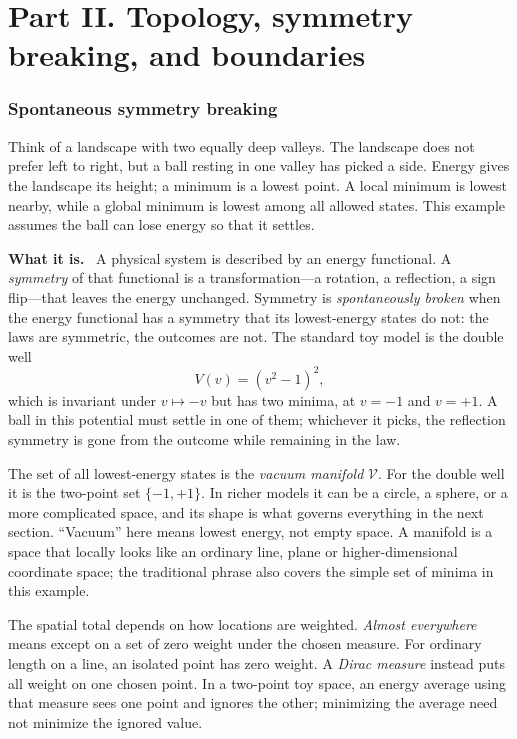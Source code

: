 \documentclass[11pt]{article}
\newcommand{\what}{\par\smallskip\noindent\textbf{What it is.}\ }
\begin{document}
\part*{Part II. Topology, symmetry breaking, and boundaries}
\section{Spontaneous symmetry breaking}
\label{sec:ssb}

Think of a landscape with two equally deep valleys. The landscape does not
prefer left to right, but a ball resting in one valley has picked a side.
Energy gives the landscape its height; a minimum is a lowest point. A local
minimum is lowest nearby, while a global minimum is lowest among all allowed
states. This example assumes the ball can lose energy so that it settles.

\what
A physical system is described by an energy functional. A \emph{symmetry} of
that functional is a transformation---a rotation, a reflection, a sign
flip---that leaves the energy unchanged. Symmetry is \emph{spontaneously
broken} when the energy functional has a symmetry that its lowest-energy
states do not: the laws are symmetric, the outcomes are not. The standard toy
model is the double well
\[
 V(v) = (v^2-1)^2 ,
\]
which is invariant under $v\mapsto -v$ but has two minima, at $v=-1$ and
$v=+1$. A ball in this potential must settle in one of them; whichever it
picks, the reflection symmetry is gone from the outcome while remaining in the
law.

The set of all lowest-energy states is the \emph{vacuum manifold}
$\mathcal{V}$. For the double well it is the two-point set $\{-1,+1\}$. In
richer models it can be a circle, a sphere, or a more complicated space, and
its shape is what governs everything in the next section. ``Vacuum'' here
means lowest energy, not empty space. A manifold is a space that locally looks
like an ordinary line, plane or higher-dimensional coordinate space; the
traditional phrase also covers the simple set of minima in this example.

The spatial total depends on how locations are weighted. \emph{Almost
everywhere} means except on a set of zero weight under the chosen measure.
For ordinary length on a line, an isolated point has zero weight. A
\emph{Dirac measure} instead puts all weight on one chosen point. In a
two-point toy space, an energy average using that measure sees one point and
ignores the other; minimizing the average need not minimize the ignored value.
\end{document}
